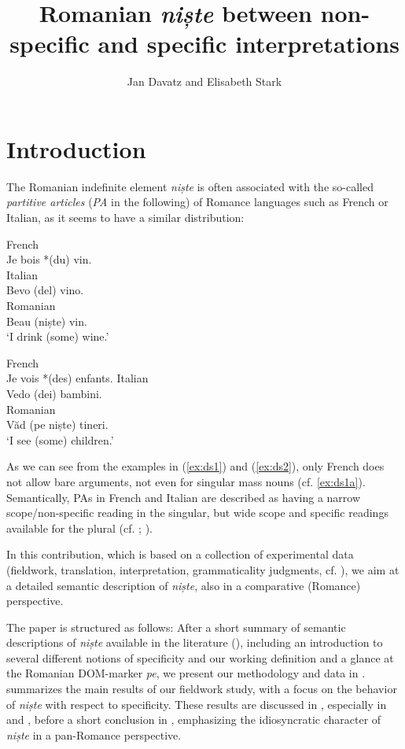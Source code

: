 \documentclass[output=paper,colorlinks,citecolor=brown]{langscibook}
\author{Jan Davatz\affiliation{University of Zurich} and Elisabeth Stark\affiliation{University of Zurich}}
\title{Romanian \textit{ni{ș}te} between non-specific and specific interpretations}
\begin{document}
\maketitle

\section{Introduction}\label{sec:ds1}

The Romanian indefinite element \textit{niște} is often associated with the so-called \textit{partitive articles} (\textit{PA} in the following) of Romance languages such as French or Italian, as it seems to have a similar distribution:

\ea\label{ex:ds1}
    \ea\label{ex:ds1a} French\\
    Je bois *(du) vin.\\
    \ex\label{ex:ds1b} Italian\\
    Bevo (del) vino.\\
    \ex\label{ex:ds1c} Romanian \\
    Beau (niște) vin.\\
     \glt ‘I drink (some) wine.’\\
    \z
\z

\ea\label{ex:ds2}
    \ea\label{ex:ds2a} French\\
    Je vois *(des) enfants.
    \ex\label{ex:ds2b} Italian\\
    Vedo (dei) bambini.\\
    \ex\label{ex:ds2c} Romanian\\
    V\u{a}d (pe niște) tineri.\\
     \glt ‘I see (some) children.’
    \z
\z

As we can see from the examples in (\ref{ex:ds1}) and (\ref{ex:ds2}), only French does not allow bare arguments, not even for singular mass nouns (cf. \ref{ex:ds1a}). Semantically, PAs in French and Italian are described as having a narrow scope/non-specific reading in the singular, but wide scope and specific readings available for the plural (cf. \citealt{Ihsane2008}; \cite{CardinalettiGiusti2016}).

In this contribution, which is based on a collection of experimental data (fieldwork, translation, interpretation, grammaticality judgments, cf. \cite{CornipsPoletto2005}), we aim at a detailed semantic description of \textit{niște}, also in a comparative (Romance) perspective.

The paper is structured as follows: After a short summary of semantic descriptions of \textit{niște} available in the literature (), including an introduction to several different notions of specificity and our working definition and a glance at the Romanian DOM-marker \textit{pe}, we present our methodology and data in .  summarizes the main results of our fieldwork study, with a focus on the behavior of \textit{niște} with respect to specificity. These results are discussed in , especially in  and , before a short conclusion in , emphasizing the idiosyncratic character of \textit{niște} in a pan-Romance perspective.
\end{document}
